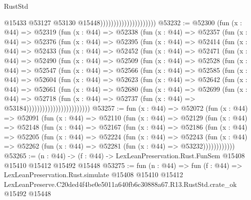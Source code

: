 \begin{lexlean}{RustStd}
\begin{coremodule}
                                              @15433
                                              @53127
                                              @53130
                                              @15448)))))))))))))))))))))
@53232 := @52300
    (fun (x : @44) =>
    @52319
      (fun (x : @44) =>
      @52338
        (fun (x : @44) =>
        @52357
          (fun (x : @44) =>
          @52376
            (fun (x : @44) =>
            @52395
              (fun (x : @44) =>
              @52414
                (fun (x : @44) =>
                @52433
                  (fun (x : @44) =>
                  @52452
                    (fun (x : @44) =>
                    @52471
                      (fun (x : @44) =>
                      @52490
                        (fun (x : @44) =>
                        @52509
                          (fun (x : @44) =>
                          @52528
                            (fun (x : @44) =>
                            @52547
                              (fun (x : @44) =>
                              @52566
                                (fun (x : @44) =>
                                @52585
                                  (fun (x : @44) =>
                                  @52604
                                    (fun (x : @44) =>
                                    @52623
                                      (fun (x : @44) =>
                                      @52642
                                        (fun (x : @44) =>
                                        @52661
                                          (fun (x : @44) =>
                                          @52680
                                            (fun (x : @44) =>
                                            @52699
                                              (fun (x : @44) =>
                                              @52718
                                                (fun (x : @44) =>
                                                @52737
                                                  (fun (x : @44) => @53184))))))))))))))))))))))))
@53257 := fun (x : @44) =>
  @52072
    (fun (x : @44) =>
    @52091
      (fun (x : @44) =>
      @52110
        (fun (x : @44) =>
        @52129
          (fun (x : @44) =>
          @52148
            (fun (x : @44) =>
            @52167
              (fun (x : @44) =>
              @52186
                (fun (x : @44) =>
                @52205
                  (fun (x : @44) =>
                  @52224
                    (fun (x : @44) =>
                    @52243
                      (fun (x : @44) =>
                      @52262 (fun (x : @44) => @52281 (fun (x : @44) => @53232))))))))))))
@53265 := (n : @44) ->
  (f : @44) -> LexLeanPreservation.Rust.FunSem @15408 @15410 @15412 @15492 @15448
@53275 := fun (n : @44) =>
  fun (f : @44) =>
  LexLeanPreservation.Rust.simulate
    @15408
    @15410
    @15412
    LexLeanPreserve.C20ded4f4be0e5011a640fb6c30888a67.R13.RustStd.crate_ok
    @15492
    @15448
\end{coremodule}
\end{lexlean}
